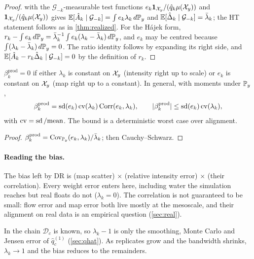 \begin{proof}
 with the $\mathcal G_{-k}$-measurable test functions
$e_k\mathbf 1_{\mathcal{X}_y}/(\hat q_k\mu(\mathcal{X}_y))$ and $\mathbf 1_{\mathcal{X}_y}/(\hat q_k\mu(\mathcal{X}_y))$ gives
$\mathbb{E}[\hat A_k\mid\mathcal G_{-k}]=\int e_k\lambda_k\,d\mathbb{P}_y$ and
$\mathbb{E}[\hat\Delta_k\mid\mathcal G_{-k}]=\bar\lambda_k$; the HT statement follows as in \cref{thm:realized}.
For the Hájek form, $r_k-\int e_k\,d\mathbb{P}_y=\bar\lambda_k^{-1}\int e_k(\lambda_k-\bar\lambda_k)\,d\mathbb{P}_y$,
and $e_k$ may be centred because $\int(\lambda_k-\bar\lambda_k)\,d\mathbb{P}_y=0$. The ratio identity
follows by expanding its right side, and $\mathbb{E}[\hat A_k-r_k\hat\Delta_k\mid\mathcal G_{-k}]=0$ by the
definition of $r_k$.
\end{proof}

\begin{corollary}\label{cor:dr}
$\beta^{\mathrm{prod}}_k=0$ if either $\lambda_k$ is constant on $\mathcal{X}_y$ (intensity right up to scale) or
$e_k$ is constant on $\mathcal{X}_y$ (map right up to a constant). In general, with moments under $\mathbb{P}_y$,
\[
  \beta^{\mathrm{prod}}_k=\operatorname{sd}(e_k)\,\mathrm{cv}(\lambda_k)\,\mathrm{Corr}(e_k,\lambda_k),
  \qquad
  |\beta^{\mathrm{prod}}_k|\le\operatorname{sd}(e_k)\,\mathrm{cv}(\lambda_k),
\]
with $\mathrm{cv}=\operatorname{sd}/\text{mean}$. The bound is a deterministic worst case over alignment.
\end{corollary}

\begin{proof}
$\beta^{\mathrm{prod}}_k=\operatorname{Cov}_{\mathbb{P}_y}(e_k,\lambda_k)/\bar\lambda_k$; then Cauchy--Schwarz.
\end{proof}

\paragraph{Reading the bias.} The bias left by DR is (map scatter) $\times$ (relative intensity error)
$\times$ (their correlation). Every weight error enters here, including water the simulation reaches but
real floats do not ($\lambda_k=0$). The
correlation is not guaranteed to be small: flow error and map error both live mostly at the mesoscale,
and their alignment on real data is an empirical question (\cref{sec:real}).

\begin{remark}\label{rem:chain-bias}
In the chain $\mathcal D_c$ is known, so $\lambda_k-1$ is only the smoothing, Monte Carlo and Jensen
error of $\hat q^{(1)}_c$ (\cref{sec:qhat}). As replicates grow and the bandwidth shrinks,
$\lambda_k\to1$ and the bias reduces to the remainders.
\end{remark}

